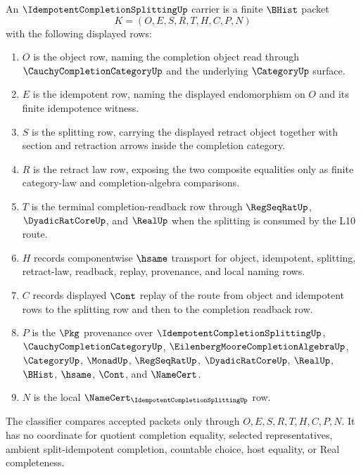 \begin{definition}
\label{def:idempotent-completion-splitting-carrier}
An $\IdempotentCompletionSplittingUp$ carrier is a finite $\BHist$ packet
$$
K=(O,E,S,R,T,H,C,P,N)
$$
with the following displayed rows:
\begin{enumerate}
\item $O$ is the object row, naming the completion object read through $\CauchyCompletionCategoryUp$ and the underlying $\CategoryUp$ surface.
\item $E$ is the idempotent row, naming the displayed endomorphism on $O$ and its finite idempotence witness.
\item $S$ is the splitting row, carrying the displayed retract object together with section and retraction arrows inside the completion category.
\item $R$ is the retract law row, exposing the two composite equalities only as finite category-law and completion-algebra comparisons.
\item $T$ is the terminal completion-readback row through $\RegSeqRatUp$, $\DyadicRatCoreUp$, and $\RealUp$ when the splitting is consumed by the L10 route.
\item $H$ records componentwise $\hsame$ transport for object, idempotent, splitting, retract-law, readback, replay, provenance, and local naming rows.
\item $C$ records displayed $\Cont$ replay of the route from object and idempotent rows to the splitting row and then to the completion readback row.
\item $P$ is the $\Pkg$ provenance over $\IdempotentCompletionSplittingUp$, $\CauchyCompletionCategoryUp$, $\EilenbergMooreCompletionAlgebraUp$, $\CategoryUp$, $\MonadUp$, $\RegSeqRatUp$, $\DyadicRatCoreUp$, $\RealUp$, $\BHist$, $\hsame$, $\Cont$, and $\NameCert$.
\item $N$ is the local $\NameCert_{\IdempotentCompletionSplittingUp}$ row.
\end{enumerate}
The classifier compares accepted packets only through $O,E,S,R,T,H,C,P,N$. It has no coordinate for quotient completion equality, selected representatives, ambient split-idempotent completion, countable choice, host equality, or Real completeness.
\end{definition}

